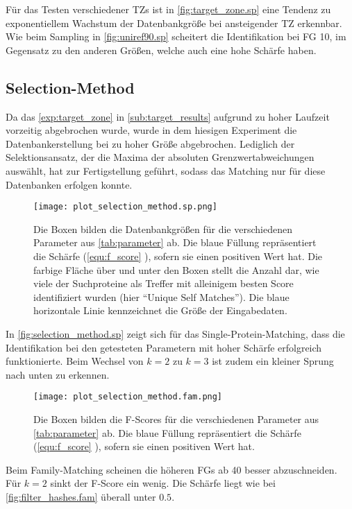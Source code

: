         Für das Testen verschiedener \aclp{TZ} ist in \autoref{fig:target_zone.sp} eine Tendenz zu exponentiellem Wachstum der Datenbankgröße bei ansteigender \ac{TZ} erkennbar. Wie beim Sampling in \autoref{fig:uniref90.sp} scheitert die Identifikation bei \ac{FG} 10, im Gegensatz zu den anderen Größen, welche auch eine hohe Schärfe haben.

    \subsection{Selection-Method} %
        \label{sub:selection_results}
        Da das \autoref{exp:target_zone} in \autoref{sub:target_results} aufgrund zu hoher Laufzeit vorzeitig abgebrochen wurde, wurde in dem hiesigen Experiment die Datenbankerstellung bei zu hoher Größe abgebrochen. Lediglich der Selektionsansatz, der die Maxima der absoluten Grenzwertabweichungen auswählt, hat zur Fertigstellung geführt, sodass das Matching nur für diese Datenbanken erfolgen konnte.

        \begin{figure}[H]
            \centering
            \texttt{[image: plot\_selection\_method.sp.png]}
            \caption[Single-Protein-Matching ]{Die Boxen bilden die Datenbankgrößen für die verschiedenen Parameter aus \autoref{tab:parameter} ab. Die blaue Füllung repräsentiert die Schärfe (\autoref{equ:f_score} ), sofern sie einen positiven Wert hat. Die farbige Fläche über und unter den Boxen stellt die Anzahl dar, wie viele der Suchproteine als Treffer mit alleinigem besten Score identifiziert wurden (hier ``Unique Self Matches''). Die blaue horizontale Linie kennzeichnet die Größe der Eingabedaten.}
            \label{fig:selection_method.sp}
        \end{figure}

        In \autoref{fig:selection_method.sp} zeigt sich für das Single-Protein-Matching, dass die Identifikation bei den getesteten Parametern mit hoher Schärfe erfolgreich funktionierte. Beim Wechsel von $k=2$ zu $k=3$ ist zudem ein kleiner Sprung nach unten zu erkennen.

        \begin{figure}[H]
            \centering
            \texttt{[image: plot\_selection\_method.fam.png]}
            \caption[Family-Matching ]{Die Boxen bilden die F-Scores für die verschiedenen Parameter aus \autoref{tab:parameter} ab. Die blaue Füllung repräsentiert die Schärfe (\autoref{equ:f_score} ), sofern sie einen positiven Wert hat.}
            \label{fig:selection_method.fam}
        \end{figure}

        Beim Family-Matching scheinen die höheren \acp{FG} ab 40 besser abzuschneiden. Für $k=2$ sinkt der F-Score ein wenig. Die Schärfe liegt wie bei \autoref{fig:filter_hashes.fam} überall unter $0.5$.
